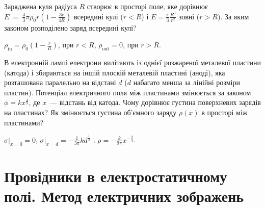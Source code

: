 \begin{problem}
Заряджена куля радіуса $R$ створює в просторі поле, яке дорівнює $E~=~\frac43\pi\rho_0 r\left( 1- \frac{3r}{4R}\right)$ всередині кулі ($r < R$) і $E = \frac{\pi}{3} \frac{R^3}{r^2}$ зовні ($r > R$). За яким законом розподілено заряд всередині кулі?
\begin{solution}
	$\rho_{\mathrm{in}} = \rho_0\left( 1 - \frac{r}{R}\right)$, при $r <R$, $\rho_{\mathrm{out}} = 0$, при $r > R$.
\end{solution}
\end{problem}

\begin{problem}
В електронній лампі електрони вилітають із однієї розжареної металевої пластини (катода) і збираються на іншій  плоскій металевій пластині (аноді), яка розташована паралельно на відстані $d$ ($d$ набагато менша за лінійні розміри пластин). Потенціал електричного поля між пластинами змінюється за законом $\phi = kx^{\frac43}$, де $x$~--- відстань від катода. Чому дорівнює густина поверхневих зарядів на пластинах? Як змінюється густина об'ємного заряду $\rho(x)$ в просторі між пластинами?
\begin{solution}
	$\left. \sigma\right|_{x=0} = 0$, $\left. \sigma\right|_{x=d} = -\frac{1}{3\pi}kd^{\frac13}$ , $\rho = -\frac{k}{9\pi} x^{-\frac{2}{3}}$.
\end{solution}
\end{problem}

\section{Провідники в електростатичному полі. Метод електричних зображень}

